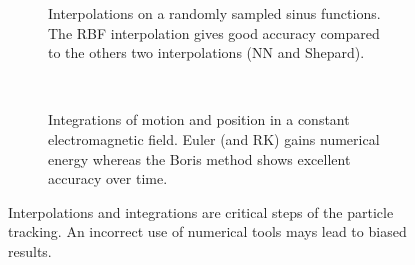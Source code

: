 \begin{figure}[!h]
	\begin{subfigure}{0.5\textwidth}
		
		\caption{Interpolations on a randomly sampled sinus functions. The RBF interpolation gives good accuracy compared to the others two interpolations (NN and Shepard).}
		\label{chap3:interpolation}
	\end{subfigure}
	~
	\begin{subfigure}{0.5\textwidth}
		
		\caption{Integrations of motion and position in a constant electromagnetic field. Euler (and RK) gains numerical energy whereas the Boris method shows excellent accuracy over time.}
		\label{chap3:integration}
	\end{subfigure}
	\caption[Interpolations and integrations are critical steps of the particle tracking]{Interpolations and integrations are critical steps of the particle tracking. An incorrect use of numerical tools mays lead to biased results.}
	\label{chap3:TrackingPitfalls}
\end{figure}
